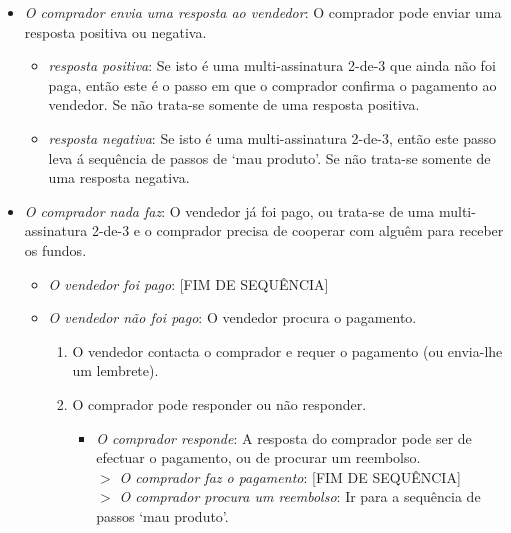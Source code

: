 \begin{enumerate}
\begin{itemize}
\begin{itemize}
            \item {\em O comprador envia uma resposta ao vendedor}: O comprador pode enviar uma resposta positiva ou negativa. 
            \begin{itemize}
                \item {\em resposta positiva}: Se isto é uma multi-assinatura 2-de-3 que ainda não foi paga, então este é o passo em que o comprador confirma o pagamento ao vendedor. Se não trata-se somente de uma resposta positiva. 
                \item {\em resposta negativa}: Se isto é uma multi-assinatura 2-de-3, então este passo leva á sequência de passos de `mau produto'. Se não trata-se somente de uma resposta negativa. 
            \end{itemize}{}
            \item {\em O comprador nada faz}: O vendedor já foi pago, ou trata-se de uma multi-assinatura 2-de-3 e o comprador precisa de cooperar com alguêm para receber os fundos. 
            \begin{itemize}
                \item {\em O vendedor foi pago}: [FIM DE SEQUÊNCIA]
                \item {\em O vendedor não foi pago}: O vendedor procura o pagamento.
                \begin{enumerate}
                    \item O vendedor contacta o comprador e requer o pagamento (ou envia-lhe um lembrete).
                    \item O comprador pode responder ou não responder.
                    \begin{itemize}
                        \item {\em O comprador responde}: A resposta do comprador pode ser de efectuar o pagamento, ou de procurar um reembolso.\\
                        $>$ {\em O comprador faz o pagamento}: [FIM DE SEQUÊNCIA]\\
                        $>$ {\em O comprador procura um reembolso}: Ir para a sequência de passos `mau produto'.

\end{itemize}
\end{enumerate}
\end{itemize}
\end{itemize}
\end{itemize}
\end{enumerate}
